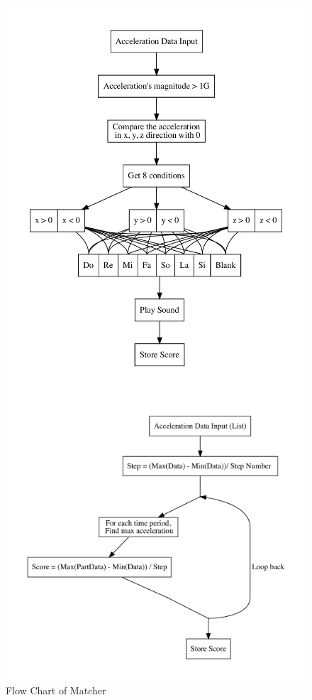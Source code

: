 \begin{figure}[H]

\begin{minipage}[b]{0.5\linewidth}
\centering
\includegraphics[width=1\linewidth]{figWR/ma}
\caption{Flow Chart of Matcher}
\label{FlowMatcher}
\vspace{4ex}
\end{minipage}%
%
\begin{minipage}[b]{0.5\linewidth}
\centering
\includegraphics[width=1\linewidth]{figWR/sc}

\end{minipage}
\end{figure}
